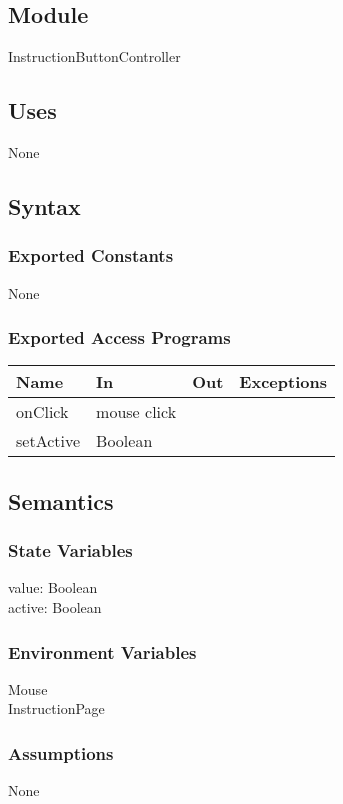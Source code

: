 \documentclass[12pt, titlepage]{article}
\begin{document}
\subsection{Module}

InstructionButtonController

\subsection{Uses}
None

\subsection{Syntax}

\subsubsection{Exported Constants}
None
\subsubsection{Exported Access Programs}

\begin{center}
\begin{tabular}{|l|l|l|p{5cm}|}
\hline
\textbf{Name} & \textbf{In} & \textbf{Out} & \textbf{Exceptions} \\
\hline
onClick & mouse click & &\\
\hline
setActive & Boolean &  &  \\
\hline
\end{tabular}
\end{center}

\subsection{Semantics}

\subsubsection{State Variables}
value: Boolean\\
active: Boolean
\subsubsection{Environment Variables}
Mouse\\
InstructionPage

\subsubsection{Assumptions}
None
\end{document}
